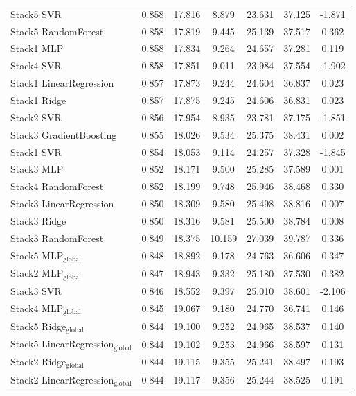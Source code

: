 \begin{table}[tp]
{\begin{tabular}{p{4.5cm}cccccc}
        Stack5 SVR & 0.858 & 17.816 & 8.879 & 23.631 & 37.125 & -1.871 \\
        Stack5 RandomForest & 0.858 & 17.819 & 9.445 & 25.139 & 37.517 & 0.362 \\
        Stack1 MLP & 0.858 & 17.834 & 9.264 & 24.657 & 37.281 & 0.119 \\
        Stack4 SVR & 0.858 & 17.851 & 9.011 & 23.984 & 37.554 & -1.902 \\
        Stack1 LinearRegression & 0.857 & 17.873 & 9.244 & 24.604 & 36.837 & 0.023 \\
        Stack1 Ridge & 0.857 & 17.875 & 9.245 & 24.606 & 36.831 & 0.023 \\
        Stack2 SVR & 0.856 & 17.954 & 8.935 & 23.781 & 37.175 & -1.851 \\
        Stack3 GradientBoosting & 0.855 & 18.026 & 9.534 & 25.375 & 38.431 & 0.002 \\
        Stack1 SVR & 0.854 & 18.053 & 9.114 & 24.257 & 37.328 & -1.845 \\
        Stack3 MLP & 0.852 & 18.171 & 9.500 & 25.285 & 37.589 & 0.001 \\
        Stack4 RandomForest & 0.852 & 18.199 & 9.748 & 25.946 & 38.468 & 0.330 \\
        Stack3 LinearRegression & 0.850 & 18.309 & 9.580 & 25.498 & 38.816 & 0.007 \\
        Stack3 Ridge & 0.850 & 18.316 & 9.581 & 25.500 & 38.784 & 0.008 \\
        Stack3 RandomForest & 0.849 & 18.375 & 10.159 & 27.039 & 39.787 & 0.336 \\
        Stack5 MLP$_{\text{global}}$ & 0.848 & 18.892 & 9.178 & 24.763 & 36.606 & 0.347 \\
        Stack2 MLP$_{\text{global}}$ & 0.847 & 18.943 & 9.332 & 25.180 & 37.530 & 0.382 \\
        Stack3 SVR & 0.846 & 18.552 & 9.397 & 25.010 & 38.601 & -2.106 \\
        Stack4 MLP$_{\text{global}}$ & 0.845 & 19.067 & 9.180 & 24.770 & 36.741 & 0.146 \\
        Stack5 Ridge$_{\text{global}}$ & 0.844 & 19.100 & 9.252 & 24.965 & 38.537 & 0.140 \\
        Stack5 LinearRegression$_{\text{global}}$ & 0.844 & 19.102 & 9.253 & 24.966 & 38.597 & 0.131 \\
        Stack2 Ridge$_{\text{global}}$ & 0.844 & 19.115 & 9.355 & 25.241 & 38.497 & 0.193 \\
        Stack2 LinearRegression$_{\text{global}}$ & 0.844 & 19.117 & 9.356 & 25.244 & 38.525 & 0.191 \\

\end{tabular}}
\end{table}
